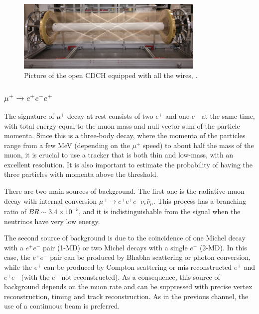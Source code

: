 \begin{figure}[!h]
\centering
\includegraphics[width =0.8\textwidth]{figures/png/Screenshot_20240307_140235.png}
\caption[MEG II detector (II).]{Picture of the open CDCH equipped with all the wires, \cite{megiicollaboration2024operation}.}
\label{fig:meg2}
\end{figure}






\subsubsection{$\mu^+ \rightarrow e^+ e^-  e^+ $}
The signature of  $\mu^+$ decay at rest consists of two $e^+$ and one $e^-$ at the same time, 
with total energy equal to the muon mass and null vector sum of the
particle momenta.
Since this is a three-body decay, where the momenta of the particles 
range from a few MeV (depending on the $\mu^+$ speed) to about half the mass of the muon, it is crucial 
to use a tracker that is both thin and low-mass, with an excellent resolution. 
It is also important to estimate the probability
of having the three particles with momenta above the  threshold.

There are two main sources of background. The first one is the radiative muon decay with 
internal conversion $\mu^+ \rightarrow e^+ e^+ e^- \nu_e \bar{\nu}_\mu$. 
This process has a branching ratio of $BR\sim 3.4 \times 10^{-5}$, and it is 
indistinguishable from the signal when the neutrinos have very low energy. 

The second source of background is due to the coincidence 
of one Michel decay with a $e^+e^-$ pair (1-MD) or two Michel decays with a single $e^-$ (2-MD). 
In this case, the $e^+e^-$ pair can be produced by Bhabha scattering or photon conversion, while the $e^+$
can be produced by Compton scattering or mis-reconstructed $e^+$ and $e^+e^-$ (with the $e^-$ not reconstructed). 
As a consequence, this source of background depends on the muon rate and
can be suppressed with precise vertex reconstruction, timing and track reconstruction.
As in the previous channel, the use of a continuous beam is preferred.



